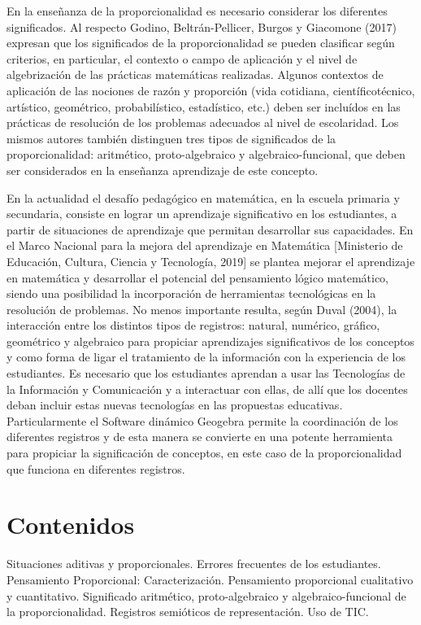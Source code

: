 \documentclass[oneside,spanish]{amsart}
\numberwithin{equation}{section}
\numberwithin{figure}{section}
\begin{document}
En la enseñanza de la proporcionalidad es necesario considerar los diferentes significados. Al respecto  Godino, Beltrán-Pellicer, Burgos y Giacomone (2017) expresan que los  significados de la proporcionalidad se pueden clasificar según criterios, en particular, el contexto o campo de aplicación y el nivel de algebrización de las prácticas matemáticas realizadas. Algunos contextos de aplicación de las nociones de razón y proporción (vida cotidiana, científicotécnico, artístico, geométrico, probabilístico, estadístico, etc.) deben ser incluídos  en las prácticas de resolución de los problemas adecuados al nivel de escolaridad. Los mismos autores también  distinguen tres tipos de significados de la proporcionalidad: aritmético, proto-algebraico y algebraico-funcional, que deben ser considerados en la enseñanza aprendizaje de este concepto.

En la actualidad el desafío pedagógico en matemática, en la escuela primaria y secundaria, consiste en lograr un aprendizaje significativo en los estudiantes, a partir de situaciones de aprendizaje que permitan desarrollar sus capacidades. En el Marco Nacional para la mejora  del aprendizaje en Matemática  [Ministerio de Educación, Cultura, Ciencia y Tecnología, 2019] se plantea mejorar el aprendizaje en matemática y desarrollar el potencial del pensamiento lógico matemático, siendo una posibilidad  la incorporación de herramientas tecnológicas en la resolución de problemas. No menos importante resulta, según Duval (2004), la interacción entre los distintos tipos de registros: natural, numérico, gráfico, geométrico y algebraico para propiciar aprendizajes significativos de los conceptos y  como forma de ligar el tratamiento de la información con la experiencia de los estudiantes. Es necesario que los estudiantes aprendan a usar las Tecnologías de la Información y Comunicación y a interactuar con ellas, de allí que los docentes deban incluir  estas nuevas tecnologías en las propuestas educativas. Particularmente el Software dinámico Geogebra permite la coordinación de los diferentes registros y de esta manera se convierte en una potente herramienta para propiciar la significación de conceptos, en este caso de la proporcionalidad que funciona en diferentes registros.

\section{Contenidos}

Situaciones aditivas y proporcionales. Errores frecuentes de los estudiantes. Pensamiento Proporcional: Caracterización. Pensamiento proporcional  cualitativo y cuantitativo. Significado aritmético, proto-algebraico y algebraico-funcional de la proporcionalidad. Registros semióticos de representación. Uso de TIC.
\end{document}
